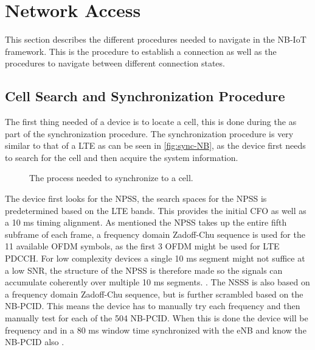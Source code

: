 




\section{Network Access}
\label{sec:Network_access}
This section describes the different procedures needed to navigate in the NB-IoT framework. This is the procedure to establish a connection as well as the procedures to navigate between different connection states. 

\subsection{Cell Search and Synchronization Procedure}
\label{sec:cellsync}
The first thing needed of a device is to locate a cell, this is done during the as part of the synchronization procedure. The synchronization procedure is very similar to that of a \gls{LTE} as can be seen in \autoref{fig:sync-NB}, as the device first needs to search for the cell and then acquire the system information. 


\begin{figure}[H]
\centering

\caption{The process needed to synchronize to a cell.}
\label{fig:sync-NB}
\end{figure}

The device first looks for the \gls{NPSS}, the search spaces for the \gls{NPSS} is predetermined based on the LTE bands.  This provides the initial \gls{CFO} as well as a 10 ms timing alignment. As mentioned the NPSS takes up the entire fifth subframe of each frame, a frequency domain Zadoff-Chu sequence is used for the 11 available \gls{OFDM} symbols, as the first 3 OFDM might be used for LTE PDCCH. For low complexity devices a single 10 ms segment might not suffice at a low \gls{SNR}, the structure of the \gls{NPSS} is therefore made so the signals can accumulate coherently over multiple 10 ms segments. \citep{NB-IoT_Book,primer}. The \gls{NSSS} is also based on a frequency domain Zadoff-Chu sequence, but is further scrambled based on the \gls{NB-PCID}. This means the device has to manually try each frequency and then manually test for each of the 504 NB-PCID. When this is done the device will be frequency and in a 80 ms window time synchronized with the eNB and know the NB-PCID also \citep{NB-IoT_Book,primer}. 

